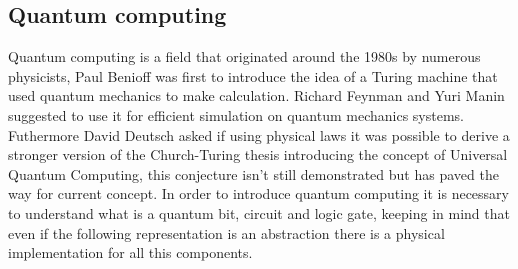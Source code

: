 \subsection{Quantum computing}
Quantum computing is a field that originated around the 1980s by numerous physicists, Paul Benioff was first to introduce the idea of a Turing machine that used quantum mechanics to make calculation. Richard Feynman and Yuri Manin suggested to use it for efficient simulation on quantum mechanics systems. Futhermore David Deutsch asked if using physical laws it was possible to derive a stronger version of the Church-Turing thesis introducing the concept of Universal Quantum Computing, this conjecture isn't still demonstrated but has paved the way for current concept. In order to introduce quantum computing it is necessary to understand what is a quantum bit, circuit and logic gate, keeping in mind that even if the following representation is an abstraction there is a physical implementation for all this components.
